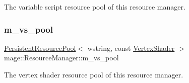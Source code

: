 The variable script resource pool of this resource manager. \hypertarget{classmage_1_1_resource_manager_abd7ceeec61ad8380f26f8f55cf530666}{}\label{classmage_1_1_resource_manager_abd7ceeec61ad8380f26f8f55cf530666} 
\subsubsection{\texorpdfstring{m\+\_\+vs\+\_\+pool}{m\_vs\_pool}}
{\footnotesize\ttfamily \hyperlink{classmage_1_1_persistent_resource_pool}{Persistent\+Resource\+Pool}$<$ wstring, const \hyperlink{classmage_1_1_vertex_shader}{Vertex\+Shader} $>$ mage\+::\+Resource\+Manager\+::m\+\_\+vs\+\_\+pool\hspace{0.3cm}{\ttfamily [private]}}

The vertex shader resource pool of this resource manager. 
